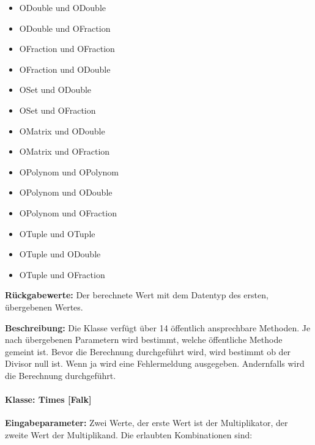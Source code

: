 \begin{itemize}
	\item ODouble und ODouble
	\item ODouble und OFraction
	\item OFraction und OFraction 
	\item OFraction und ODouble 
	\item OSet und ODouble
	\item OSet und OFraction
	\item OMatrix und ODouble 
	\item OMatrix und OFraction
	\item OPolynom und OPolynom 
	\item OPolynom und ODouble
	\item OPolynom und OFraction 
	\item OTuple und OTuple
	\item OTuple und ODouble
	\item OTuple und OFraction 
\end{itemize}

\textbf{Rückgabewerte:} Der berechnete Wert mit dem Datentyp des ersten, übergebenen Wertes.
 
\textbf{Beschreibung: }Die Klasse verfügt über 14 öffentlich ansprechbare Methoden. Je nach übergebenen Parametern wird bestimmt, welche öffentliche Methode gemeint ist. Bevor die Berechnung durchgeführt wird, wird bestimmt ob der Divisor null ist. Wenn ja wird eine Fehlermeldung ausgegeben. Andernfalls wird die Berechnung durchgeführt. 

\paragraph{Klasse: Times [Falk]}

\textbf{Eingabeparameter: }Zwei Werte, der erste Wert ist der Multiplikator, der zweite Wert der Multiplikand. Die erlaubten Kombinationen sind: 

